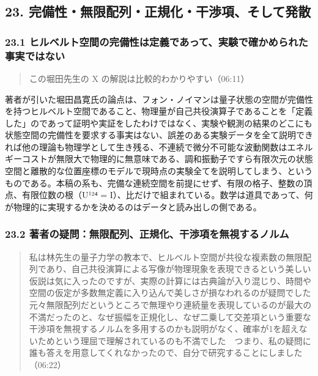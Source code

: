 \documentclass[
  a4paper,
]{ltjsarticle}
\begin{document}
\subsection{23.
完備性・無限配列・正規化・干渉項、そして発散}\label{ux5b8cux5099ux6027ux7121ux9650ux914dux5217ux6b63ux898fux5316ux5e72ux6e09ux9805ux305dux3057ux3066ux767aux6563}

\subsubsection{23.1
ヒルベルト空間の完備性は定義であって、実験で確かめられた事実ではない}\label{ux30d2ux30ebux30d9ux30ebux30c8ux7a7aux9593ux306eux5b8cux5099ux6027ux306fux5b9aux7fa9ux3067ux3042ux3063ux3066ux5b9fux9a13ux3067ux78baux304bux3081ux3089ux308cux305fux4e8bux5b9fux3067ux306fux306aux3044}

\begin{quote}
この堀田先生の X の解説は比較的わかりやすい（06:11）
\end{quote}

著者が引いた堀田昌寛氏の論点は、フォン・ノイマンは量子状態の空間が完備性を持つヒルベルト空間であること、物理量が自己共役演算子であることを「定義した」のであって証明や実証をしたわけではなく、実験や観測の結果のどこにも状態空間の完備性を要求する事実はない、誤差のある実験データを全て説明できれば他の理論も物理学として生き残る、不連続で微分不可能な波動関数はエネルギーコストが無限大で物理的に無意味である、調和振動子ですら有限次元の状態空間と離散的な位置座標のモデルで現時点の実験全てを説明してしまう、というものである。本稿の系も、完備な連続空間を前提にせず、有限の格子、整数の頂点、有限位数の根（U¹²⁴
=
I）、比だけで組まれている。数学は道具であって、何が物理的に実現するかを決めるのはデータと読み出しの側である。

\subsubsection{23.2
著者の疑問：無限配列、正規化、干渉項を無視するノルム}\label{ux8457ux8005ux306eux7591ux554fux7121ux9650ux914dux5217ux6b63ux898fux5316ux5e72ux6e09ux9805ux3092ux7121ux8996ux3059ux308bux30ceux30ebux30e0}

\begin{quote}
私は林先生の量子力学の教本で、ヒルベルト空間が共役な複素数の無限配列であり、自己共役演算による写像が物理現象を表現できるという美しい仮説は気に入ったのですが、実際の計算には古典論が入り混じり、時間や空間の仮定が多数無定義に入り込んで美しさが損なわれるのが疑問でした　元々無限配列だというところで無理やり連続量を表現しているのが最大の不満だったのと、なぜ振幅を正規化し、なぜ二乗して交差項という重要な干渉項を無視するノルムを多用するのかも説明がなく、確率が1を超えないためという理屈で理解されているのも不満でした　つまり、私の疑問に誰も答えを用意してくれなかったので、自分で研究することにしました（06:22）
\end{quote}
\end{document}
